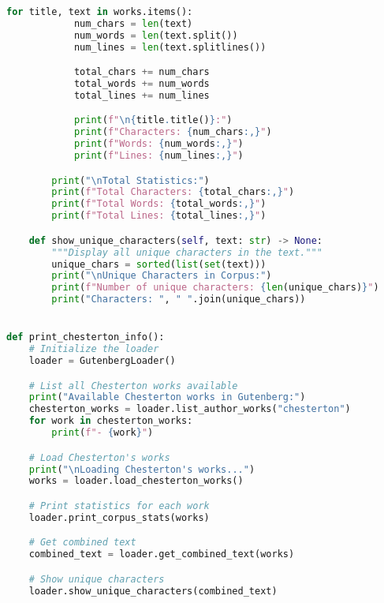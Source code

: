 \documentclass[12pt]{article}
\begin{document}
\begin{lstlisting}[language=Python]
        for title, text in works.items():
            num_chars = len(text)
            num_words = len(text.split())
            num_lines = len(text.splitlines())

            total_chars += num_chars
            total_words += num_words
            total_lines += num_lines

            print(f"\n{title.title()}:")
            print(f"Characters: {num_chars:,}")
            print(f"Words: {num_words:,}")
            print(f"Lines: {num_lines:,}")

        print("\nTotal Statistics:")
        print(f"Total Characters: {total_chars:,}")
        print(f"Total Words: {total_words:,}")
        print(f"Total Lines: {total_lines:,}")

    def show_unique_characters(self, text: str) -> None:
        """Display all unique characters in the text."""
        unique_chars = sorted(list(set(text)))
        print("\nUnique Characters in Corpus:")
        print(f"Number of unique characters: {len(unique_chars)}")
        print("Characters: ", " ".join(unique_chars))


def print_chesterton_info():
    # Initialize the loader
    loader = GutenbergLoader()

    # List all Chesterton works available
    print("Available Chesterton works in Gutenberg:")
    chesterton_works = loader.list_author_works("chesterton")
    for work in chesterton_works:
        print(f"- {work}")

    # Load Chesterton's works
    print("\nLoading Chesterton's works...")
    works = loader.load_chesterton_works()

    # Print statistics for each work
    loader.print_corpus_stats(works)

    # Get combined text
    combined_text = loader.get_combined_text(works)

    # Show unique characters
    loader.show_unique_characters(combined_text)
\end{lstlisting}
\end{document}
